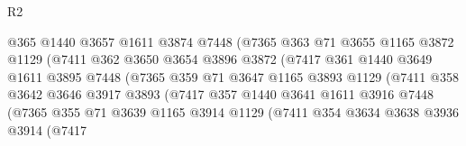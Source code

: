 \begin{lexlean}{R2}
\begin{coremodule}
                              @365
                              @1440
                              @3657
                              @1611
                              @3874
                              @7448
                              (@7365
                                @363
                                @71
                                @3655
                                @1165
                                @3872
                                @1129
                                (@7411
                                  @362
                                  @3650
                                  @3654
                                  @3896
                                  @3872
                                  (@7417
                                    @361
                                    @1440
                                    @3649
                                    @1611
                                    @3895
                                    @7448
                                    (@7365
                                      @359
                                      @71
                                      @3647
                                      @1165
                                      @3893
                                      @1129
                                      (@7411
                                        @358
                                        @3642
                                        @3646
                                        @3917
                                        @3893
                                        (@7417
                                          @357
                                          @1440
                                          @3641
                                          @1611
                                          @3916
                                          @7448
                                          (@7365
                                            @355
                                            @71
                                            @3639
                                            @1165
                                            @3914
                                            @1129
                                            (@7411
                                              @354
                                              @3634
                                              @3638
                                              @3936
                                              @3914
                                              (@7417

\end{coremodule}
\end{lexlean}
